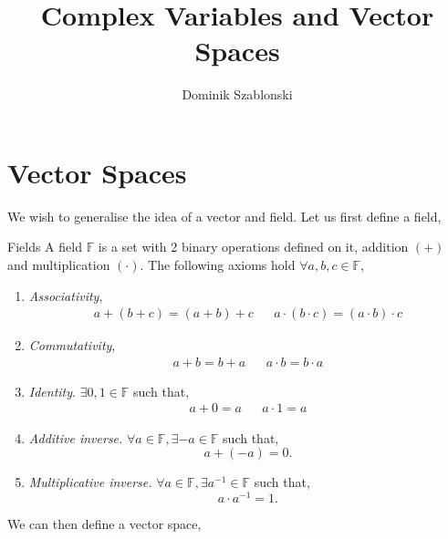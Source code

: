 \documentclass{book}
\title{Complex Variables and Vector Spaces}
\author{Dominik Szablonski}
\begin{document}
\maketitle

\tableofcontents

\chapter{Vector Spaces}
We wish to generalise the idea of a vector and field. Let us first define a field,
\begin{Definitions}{Fields}{}
	A field $\mathbb{F}$ is a set with 2 binary operations defined on it, addition $(+)$ and multiplication $(\cdot)$. The following axioms hold $\forall a,b,c \in \mathbb{F}$,
	\begin{enumerate}
		\item \textit{Associativity}, \begin{align}
			a + (b + c) = (a + b) + c &&
			a \cdot (b\cdot c) = (a\cdot b) \cdot c
		\end{align}
		\item \textit{Commutativity}, \begin{align}
			a + b = b + a &&
			a\cdot b = b\cdot a
		\end{align}
		\item \textit{Identity}. $\exists 0, 1 \in \mathbb{F}$ such that,
		\begin{align}
			a + 0 = a &&
			a\cdot 1 = a
		\end{align}
		\item \textit{Additive inverse.} $\forall a \in \mathbb{F}, \exists -a \in \mathbb{F}$ such that,
		\begin{equation}
			a + (-a) = 0.
		\end{equation}
		\item \textit{Multiplicative inverse.} $\forall a \in \mathbb{F}, \exists a^{-1} \in \mathbb{F}$ such that,
		\begin{equation}
			a \cdot a^{-1} = 1.
		\end{equation}
	\end{enumerate}
\end{Definitions}
We can then define a vector space,
\end{document}
